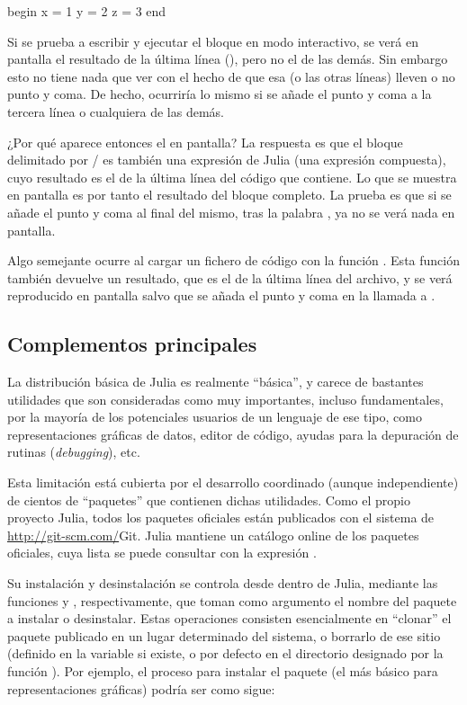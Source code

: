 \begin{juliacode}
begin
  x = 1
  y = 2
  z = 3
end
\end{juliacode}

Si se prueba a escribir y ejecutar el bloque en modo interactivo, se verá en pantalla el resultado de la última línea (), pero no el de las demás. Sin embargo esto no tiene nada que ver con el hecho de que esa (o las otras líneas) lleven o no punto y coma. De hecho, ocurriría lo mismo si se añade el punto y coma a la tercera línea o cualquiera de las demás.

¿Por qué aparece entonces el  en pantalla? La respuesta es que el bloque delimitado por / es también una expresión de Julia (una expresión compuesta), cuyo resultado es el de la última línea del código que contiene. Lo que se muestra en pantalla es por tanto el resultado del bloque completo. La prueba es que si se añade el punto y coma al final del mismo, tras la palabra , ya no se verá nada en pantalla.

Algo semejante ocurre al cargar un fichero de código con la función . Esta función también devuelve un resultado, que es el de la última línea del archivo, y se verá reproducido en pantalla salvo que se añada el punto y coma en la llamada a .

\subsection{Complementos principales}

La distribución básica de Julia es realmente ``básica'', y carece de bastantes utilidades que son consideradas como muy importantes, incluso fundamentales, por la mayoría de los potenciales usuarios de un lenguaje de ese tipo, como representaciones gráficas de datos, editor de código, ayudas para la depuración de rutinas (\emph{debugging}), etc.

Esta limitación está cubierta por el desarrollo coordinado (aunque independiente) de cientos de ``paquetes'' que contienen dichas utilidades. Como el propio proyecto Julia, todos los paquetes oficiales están publicados con el sistema de \url{http://git-scm.com/}{Git}. Julia mantiene un catálogo online de los paquetes oficiales, cuya lista se puede consultar con la expresión .

Su instalación y desinstalación se controla desde dentro de Julia, mediante las funciones  y , respectivamente, que toman como argumento el nombre del paquete a instalar o desinstalar. Estas operaciones consisten esencialmente en ``clonar'' el paquete publicado en un lugar determinado del sistema, o borrarlo de ese sitio (definido en la variable  si existe, o por defecto en el directorio designado por la función ). Por ejemplo, el proceso para instalar el paquete  (el más básico para representaciones gráficas) podría ser como sigue:

